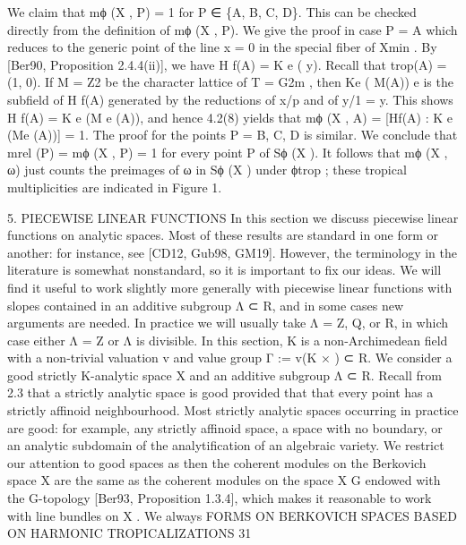 \documentclass[
  10pt,
]{article}
\newenvironment{Shaded}{}{}
\newcommand{\NormalTok}[1]{#1}
\begin{document}
\begin{Shaded}
\begin{Highlighting}[]
\NormalTok{   We claim that mϕ (X , P) = 1 for P ∈ \{A, B, C, D\}. This can be checked directly from}
\NormalTok{the definition of mϕ (X , P). We give the proof in case P = A which reduces to the generic}
\NormalTok{point of the line x = 0 in the special fiber of Xmin . By [Ber90, Proposition 2.4.4(ii)],}
\NormalTok{we have H  f(A) = K e ( y). Recall that trop(A) = (1, 0). If M = Z2 be the character lattice}
\NormalTok{of T = G2m , then Ke ( M(A))}
\NormalTok{                       e      is the subfield of H f(A) generated by the reductions of x/p}
\NormalTok{and of y/1 = y. This shows H     f(A) = K e (M}
\NormalTok{                                             e (A)), and hence 4.2(8) yields that mϕ (X , A) =}
\NormalTok{[Hf(A) : K}
\NormalTok{         e (Me (A))] = 1. The proof for the points P = B, C, D is similar.}
\NormalTok{   We conclude that mrel (P) = mϕ (X , P) = 1 for every point P of Sϕ (X ). It follows that}
\NormalTok{mϕ (X , ω) just counts the preimages of ω in Sϕ (X ) under ϕtrop ; these tropical multiplicities}
\NormalTok{are indicated in Figure 1.}

\NormalTok{                              5. PIECEWISE LINEAR FUNCTIONS}
\NormalTok{   In this section we discuss piecewise linear functions on analytic spaces. Most of these}
\NormalTok{results are standard in one form or another: for instance, see [CD12, Gub98, GM19].}
\NormalTok{However, the terminology in the literature is somewhat nonstandard, so it is important}
\NormalTok{to fix our ideas. We will find it useful to work slightly more generally with piecewise}
\NormalTok{linear functions with slopes contained in an additive subgroup Λ ⊂ R, and in some cases}
\NormalTok{new arguments are needed. In practice we will usually take Λ = Z, Q, or R, in which case}
\NormalTok{either Λ = Z or Λ is divisible.}
\NormalTok{   In this section, K is a non{-}Archimedean field with a non{-}trivial valuation v and value}
\NormalTok{group Γ := v(K × ) ⊂ R. We consider a good strictly K{-}analytic space X and an additive}
\NormalTok{subgroup Λ ⊂ R. Recall from 2.3 that a strictly analytic space is good provided that that}
\NormalTok{every point has a strictly affinoid neighbourhood. Most strictly analytic spaces occurring}
\NormalTok{in practice are good: for example, any strictly affinoid space, a space with no boundary,}
\NormalTok{or an analytic subdomain of the analytification of an algebraic variety. We restrict our}
\NormalTok{attention to good spaces as then the coherent modules on the Berkovich space X are}
\NormalTok{the same as the coherent modules on the space X G endowed with the G{-}topology [Ber93,}
\NormalTok{Proposition 1.3.4], which makes it reasonable to work with line bundles on X . We always}
\NormalTok{               FORMS ON BERKOVICH SPACES BASED ON HARMONIC TROPICALIZATIONS                       31}


\end{Highlighting}
\end{Shaded}
\end{document}

